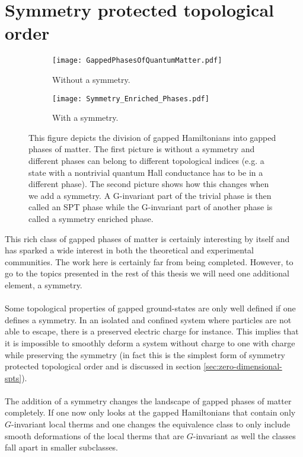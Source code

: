 \section{Symmetry protected topological order}
\begin{figure}
	\begin{subfigure}[b]{0.45\textwidth}
		\centering
		\texttt{[image: GappedPhasesOfQuantumMatter.pdf]}
		\caption{Without a symmetry.}
	\end{subfigure}
	\hfil
	\begin{subfigure}[b]{0.45\textwidth}
		\centering
		\texttt{[image: Symmetry\_Enriched\_Phases.pdf]}
		\caption{With a symmetry.}
	\end{subfigure}
	\caption{This figure depicts the division of gapped Hamiltonians into gapped phases of matter. The first picture is without a symmetry and different phases can belong to different topological indices (e.g. a state with a nontrivial quantum Hall conductance has to be in a different phase). The second picture shows how this changes when we add a symmetry. A G-invariant part of the trivial phase is then called an SPT phase while the G-invariant part of another phase is called a symmetry enriched phase.}
	\label{fig:SymmetryEnrichedIntroduction}
\end{figure}
This rich class of gapped phases of matter is certainly interesting by itself and has sparked a wide interest in both the theoretical and experimental communities. The work here is certainly far from being completed. However, to go to the topics presented in the rest of this thesis we will need one additional element, a symmetry.
\\\\
Some topological properties of gapped ground-states are only well defined if one defines a symmetry. In an isolated and confined system where particles are not able to escape, there is a preserved electric charge for instance. This implies that it is impossible to smoothly deform a system without charge to one with charge while preserving the symmetry (in fact this is the simplest form of symmetry protected topological order and is discussed in section \ref{sec:zero-dimensional-spts}).
\\\\
The addition of a symmetry changes the landscape of gapped phases of matter completely. If one now only looks at the gapped Hamiltonians that contain only $G$-invariant local therms and one changes the equivalence class to only include smooth deformations of the local therms that are $G$-invariant as well the classes fall apart in smaller subclasses.
